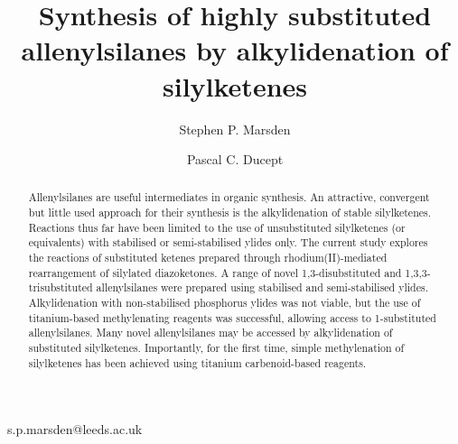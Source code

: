 \documentclass[utf8]{beilstein}
\begin{document}
\title{Synthesis of highly substituted allenylsilanes by alkylidenation of silylketenes}
\author*{Stephen P. Marsden}{s.p.marsden@leeds.ac.uk}
\author{Pascal C. Ducept}
\maketitle

\begin{abstract}
\background Allenylsilanes are useful intermediates in organic synthesis. An attractive,
convergent but little used approach for their synthesis is the alkylidenation of stable silylketenes. Reactions thus far have been limited to the use of unsubstituted silylketenes (or equivalents) with stabilised or semi-stabilised ylides only. The current study explores the reactions of substituted ketenes prepared through rhodium(II)-mediated rearrangement of silylated diazoketones.
\results A range of novel 1,3-disubstituted and 1,3,3-trisubstituted allenylsilanes were prepared using stabilised and semi-stabilised ylides. Alkylidenation with non-stabilised phosphorus ylides was not viable, but the use of titanium-based methylenating reagents was successful, allowing access to 1-substituted allenylsilanes.
\conclusion Many novel allenylsilanes may be accessed by alkylidenation of substituted silylketenes. Importantly, for the first time, simple methylenation of silylketenes has been achieved using titanium carbenoid-based reagents.
\end{abstract}
\end{document}
